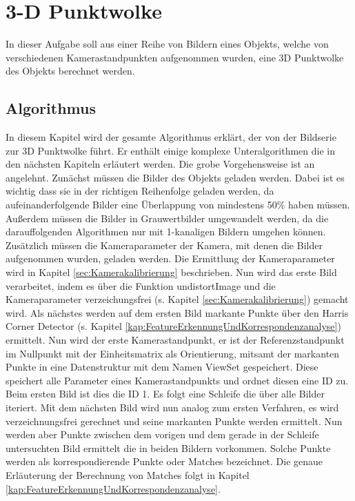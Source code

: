 \section{3-D Punktwolke}
\label{3-D Punktwolke}
In dieser Aufgabe soll aus einer Reihe von Bildern eines Objekts, welche von verschiedenen Kamerastandpunkten aufgenommen wurden, eine 3D Punktwolke des Objekts berechnet werden. 

\subsection{Algorithmus}
In diesem Kapitel wird der gesamte Algorithmus erklärt, der von der Bildserie zur 3D Punktwolke führt. Er enthält einige komplexe Unteralgorithmen die in den nächsten Kapiteln erläutert werden. Die grobe Vorgehensweise ist an \cite{Mathworks} angelehnt.
Zunächst müssen die Bilder des Objekts geladen werden. Dabei ist es wichtig dass sie in der richtigen Reihenfolge geladen werden, da aufeinanderfolgende Bilder eine Überlappung von mindestens 50\% haben müssen. Außerdem müssen die Bilder in Grauwertbilder umgewandelt werden, da die darauffolgenden Algorithmen nur mit 1-kanaligen Bildern umgehen können. Zusätzlich müssen die Kameraparameter der Kamera, mit denen die Bilder aufgenommen wurden, geladen werden. Die Ermittlung der Kameraparameter wird in Kapitel \ref{sec:Kamerakalibrierung} beschrieben.
Nun wird das erste Bild verarbeitet, indem es über die Funktion undistortImage und die Kameraparameter verzeichungsfrei (s. Kapitel \ref{sec:Kamerakalibrierung}) gemacht wird.
Als nächstes werden auf dem ersten Bild markante Punkte über den Harris Corner Detector (s. Kapitel \ref{kap:FeatureErkennungUndKorrespondenzanalyse}) ermittelt. Nun wird der erste Kamerastandpunkt, er ist der Referenzstandpunkt im Nullpunkt mit der Einheitsmatrix als Orientierung, mitsamt der markanten Punkte in eine Datenstruktur mit dem Namen ViewSet gespeichert. Diese speichert alle Parameter eines Kamerastandpunkts und ordnet diesen eine ID zu. Beim ersten Bild ist dies die ID 1.
Es folgt eine Schleife die über alle Bilder iteriert. Mit dem nächsten Bild wird nun analog zum ersten Verfahren, es wird verzeichnungsfrei gerechnet und seine markanten Punkte werden ermittelt. Nun werden aber Punkte zwischen dem vorigen und dem gerade in der Schleife untersuchten Bild ermittelt die in beiden Bildern vorkommen. Solche Punkte werden als korrespondierende Punkte oder Matches bezeichnet. Die genaue Erläuterung der Berechnung von Matches folgt in Kapitel \ref{kap:FeatureErkennungUndKorrespondenzanalyse}.
